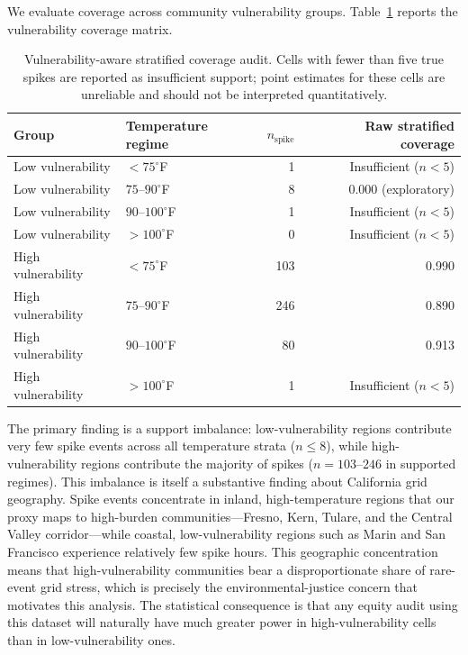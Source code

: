 \documentclass{article}
\newcommand{\spike}{\mathrm{spike}}
\begin{document}
We evaluate coverage across community vulnerability groups.
Table~\ref{tab:vulnerability} reports the vulnerability coverage matrix.

\begin{table}[t]
\centering
\caption{Vulnerability-aware stratified coverage audit. Cells with fewer
than five true spikes are reported as insufficient support; point estimates
for these cells are unreliable and should not be interpreted quantitatively.}
\label{tab:vulnerability}
\begin{tabular}{llrr}
\toprule
Group & Temperature regime & $n_{\spike}$ & Raw stratified coverage \\
\midrule
Low vulnerability & $<75^{\circ}$F        &  1 & Insufficient ($n<5$) \\
Low vulnerability & $75$--$90^{\circ}$F   &  8 & 0.000 (exploratory) \\
Low vulnerability & $90$--$100^{\circ}$F  &  1 & Insufficient ($n<5$) \\
Low vulnerability & $>100^{\circ}$F       &  0 & Insufficient ($n<5$) \\
\midrule
High vulnerability & $<75^{\circ}$F       & 103 & 0.990 \\
High vulnerability & $75$--$90^{\circ}$F  & 246 & 0.890 \\
High vulnerability & $90$--$100^{\circ}$F &  80 & 0.913 \\
High vulnerability & $>100^{\circ}$F      &   1 & Insufficient ($n<5$) \\
\bottomrule
\end{tabular}
\end{table}

The primary finding is a support imbalance: low-vulnerability regions
contribute very few spike events across all temperature strata ($n \leq 8$),
while high-vulnerability regions contribute the majority of spikes
($n = 103$--$246$ in supported regimes). This imbalance is itself a
substantive finding about California grid geography. Spike events concentrate
in inland, high-temperature regions that our proxy maps to high-burden
communities---Fresno, Kern, Tulare, and the Central Valley corridor---while
coastal, low-vulnerability regions such as Marin and San Francisco experience
relatively few spike hours. This geographic concentration means that
high-vulnerability communities bear a disproportionate share of rare-event
grid stress, which is precisely the environmental-justice concern that
motivates this analysis. The statistical consequence is that any equity audit
using this dataset will naturally have much greater power in high-vulnerability
cells than in low-vulnerability ones.
\end{document}
